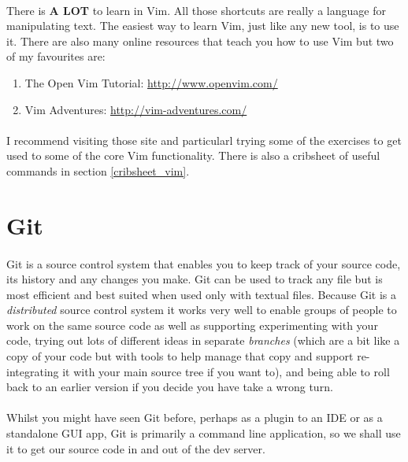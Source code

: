 \documentclass[12pt, a4paper, oneside]{book}
\begin{document}
\paragraph{} There is \textbf{A LOT} to learn in Vim. All those shortcuts are really a language for manipulating text. The easiest way to learn Vim, just like any new tool, is to use it. There are also many online resources that teach you how to use Vim but two of my favourites are:
\begin{enumerate}
\item The Open Vim Tutorial: \url{http://www.openvim.com/}
\item Vim Adventures: \url{http://vim-adventures.com/}
\end{enumerate}

\paragraph{} I recommend visiting those site and particularl trying some of the exercises to get used to some of the core Vim functionality. There is also a cribsheet of useful commands in section \ref{cribsheet_vim}.

\section{Git}
\label{git}
\paragraph{} Git is a source control system that enables you to keep track of your source code, its history and any changes you make. Git can be used to track any file but is most efficient and best suited when used only with textual files. Because Git is a \emph{distributed} source control system it works very well to enable groups of people to work on the same source code as well as supporting experimenting with your code, trying out lots of different ideas in separate \emph{branches} (which are a bit like a copy of your code but with tools to help manage that copy and support re-integrating it with your main source tree if you want to), and being able to roll back to an earlier version if you decide you have take a wrong turn.

\paragraph{} Whilst you might have seen Git before, perhaps as a plugin to an IDE or as a standalone GUI app, Git is primarily a command line application, so we shall use it to get our source code in and out of the dev server.
\end{document}
